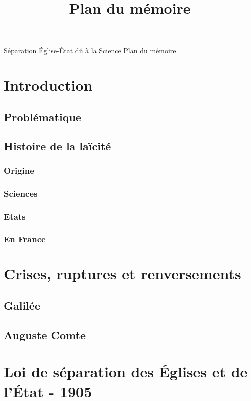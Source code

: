 \documentclass{article}
\title{Plan du m\'emoire}
\begin{document}
\maketitle

\begin{center}
\LARGE{S\'eparation \'Eglise-\'Etat d\^u à la Science}
\LARGE{Plan du m\'emoire}
\end{center}

\section{Introduction}
\subsection{Probl\'ematique}
\subsection{Histoire de la la\"icit\'e}
\subsubsection{Origine}
\subsubsection{Sciences}
\subsubsection{Etats}
\subsubsection{En France}

\section{Crises, ruptures et renversements}
\subsection{Galil\'ee}
\subsection{Auguste Comte}

\section{Loi de s\'eparation des \'Eglises et de l'\'Etat - 1905}
\end{document}
